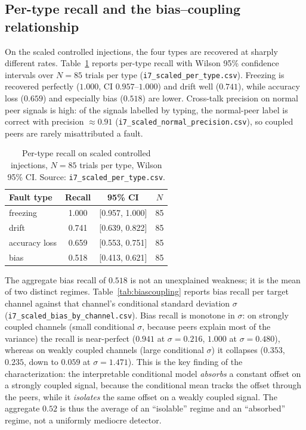 \subsection{Per-type recall and the bias--coupling relationship}
\label{sec:per-type}
On the scaled controlled injections, the four types are recovered at sharply different rates. Table~\ref{tab:pertype} reports per-type recall with Wilson 95\% confidence intervals over $N=85$ trials per type (\texttt{i7\_scaled\_per\_type.csv}). Freezing is recovered perfectly ($1.000$, CI $0.957$--$1.000$) and drift well ($0.741$), while accuracy loss ($0.659$) and especially bias ($0.518$) are lower. Cross-talk precision on normal peer signals is high: of the signals labelled by typing, the normal-peer label is correct with precision $\approx 0.91$ (\texttt{i7\_scaled\_normal\_precision.csv}), so coupled peers are rarely misattributed a fault.

\begin{table}[t]
    \centering
    \caption{Per-type recall on scaled controlled injections, $N=85$ trials per type, Wilson 95\% CI. Source: \texttt{i7\_scaled\_per\_type.csv}.}
    \label{tab:pertype}
    \begin{tabular}{lccc}
        \toprule
        Fault type & Recall & 95\% CI & $N$ \\
        \midrule
        freezing      & 1.000 & [0.957, 1.000] & 85 \\
        drift         & 0.741 & [0.639, 0.822] & 85 \\
        accuracy loss & 0.659 & [0.553, 0.751] & 85 \\
        bias          & 0.518 & [0.413, 0.621] & 85 \\
        \bottomrule
    \end{tabular}
\end{table}

The aggregate bias recall of $0.518$ is not an unexplained weakness; it is the mean of two distinct regimes. Table~\ref{tab:biascoupling} reports bias recall per target channel against that channel's conditional standard deviation $\sigma$ (\texttt{i7\_scaled\_bias\_by\_channel.csv}). Bias recall is monotone in $\sigma$: on strongly coupled channels (small conditional $\sigma$, because peers explain most of the variance) the recall is near-perfect ($0.941$ at $\sigma=0.216$, $1.000$ at $\sigma=0.480$), whereas on weakly coupled channels (large conditional $\sigma$) it collapses ($0.353$, $0.235$, down to $0.059$ at $\sigma=1.471$). This is the key finding of the characterization: the interpretable conditional model \emph{absorbs} a constant offset on a strongly coupled signal, because the conditional mean tracks the offset through the peers, while it \emph{isolates} the same offset on a weakly coupled signal. The aggregate $0.52$ is thus the average of an ``isolable'' regime and an ``absorbed'' regime, not a uniformly mediocre detector.

